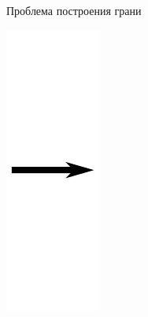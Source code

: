 \documentclass{beamer}
\begin{document}
\begin{frame}{Проблема построения грани}
\begin{minipage}{.1\textwidth}
        \includegraphics[width=0.8\linewidth]{affine2.pdf}

\end{minipage}
\end{frame}
\end{document}
